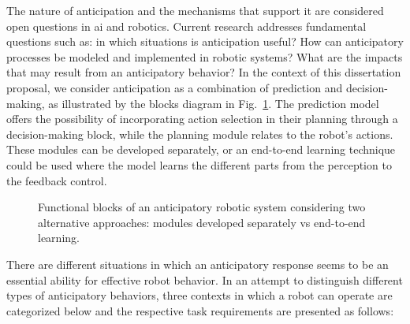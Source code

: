 The nature of anticipation and the mechanisms that support it are considered open questions in \acs{ai} and robotics. Current research addresses fundamental questions such as: in which situations is anticipation useful? How can anticipatory processes be modeled and implemented in robotic systems? What are the impacts that may result from an anticipatory behavior? In the context of this dissertation proposal, we consider anticipation as a combination of prediction and decision-making, as illustrated by the blocks diagram in Fig.~\ref{fig:anticipatorysystem}. The prediction model offers the possibility of incorporating action selection in their planning through a decision-making block, while the planning module relates to the robot’s actions. These modules can be developed separately, or an end-to-end learning technique could be used where the model learns the different parts from the perception to the feedback control. 

\begin{figure}[H]%
    \centering
    
    \caption{Functional blocks of an anticipatory robotic system considering two alternative approaches: modules developed separately vs end-to-end learning.}
    \label{fig:anticipatorysystem}
\end{figure}

There are different situations in which an anticipatory response seems to be an essential ability for effective robot behavior. In an attempt to distinguish different types of anticipatory behaviors, three contexts in which a robot can operate are categorized below and the respective task requirements are presented as follows:

